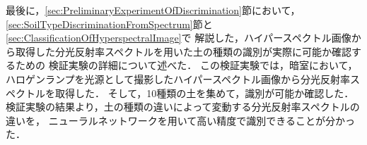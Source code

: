 最後に，\ref{sec:PreliminaryExperimentOfDiscrimination}節において，
\ref{sec:SoilTypeDiscriminationFromSpectrum}節と\ref{sec:ClassificationOfHyperspectralImage}で
解説した，ハイパースペクトル画像から取得した分光反射率スペクトルを用いた土の種類の識別が実際に可能か確認するための
検証実験の詳細について述べた．
この検証実験では，暗室において，ハロゲンランプを光源として撮影したハイパースペクトル画像から分光反射率スペクトルを取得した．
そして，10種類の土を集めて，識別が可能か確認した．
検証実験の結果より，土の種類の違いによって変動する分光反射率スペクトルの違いを，
ニューラルネットワークを用いて高い精度で識別できることが分かった．

\newpage

